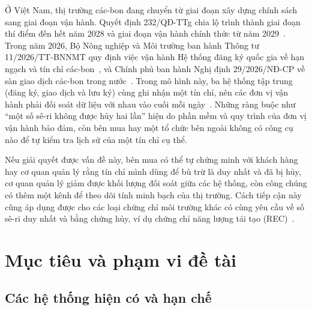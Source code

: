 Ở Việt Nam, thị trường các-bon đang chuyển từ giai đoạn xây dựng chính sách sang giai đoạn vận hành. Quyết định 232/QĐ-TTg chia lộ trình thành giai đoạn thí điểm đến hết năm 2028 và giai đoạn vận hành chính thức từ năm 2029~\cite{vietnam2025qd232}. Trong năm 2026, Bộ Nông nghiệp và Môi trường ban hành Thông tư 11/2026/TT-BNNMT quy định việc vận hành Hệ thống đăng ký quốc gia về hạn ngạch và tín chỉ các-bon~\cite{vietnam2026thongtu11}, và Chính phủ ban hành Nghị định 29/2026/NĐ-CP về sàn giao dịch các-bon trong nước~\cite{vietnam2026nghidinh29}. Trong mô hình này, ba hệ thống tập trung (đăng ký, giao dịch và lưu ký) cùng ghi nhận một tín chỉ, nên các đơn vị vận hành phải đối soát dữ liệu với nhau vào cuối mỗi ngày~\cite{vietnam2026thongtu11}. Những ràng buộc như ``một số sê-ri không được hủy hai lần'' hiện do phần mềm và quy trình của đơn vị vận hành bảo đảm, còn bên mua hay một tổ chức bên ngoài không có công cụ nào để tự kiểm tra lịch sử của một tín chỉ cụ thể.

Nếu giải quyết được vấn đề này, bên mua có thể tự chứng minh với khách hàng hay cơ quan quản lý rằng tín chỉ mình dùng để bù trừ là duy nhất và đã bị hủy, cơ quan quản lý giảm được khối lượng đối soát giữa các hệ thống, còn công chúng có thêm một kênh để theo dõi tính minh bạch của thị trường. Cách tiếp cận này cũng áp dụng được cho các loại chứng chỉ môi trường khác có cùng yêu cầu về số sê-ri duy nhất và bằng chứng hủy, ví dụ chứng chỉ năng lượng tái tạo (REC)~\cite{liu2024blockchain}.

\section{Mục tiêu và phạm vi đề tài}
\label{sec:muctieu}
\label{sec:nhiemvu}

\subsection*{Các hệ thống hiện có và hạn chế}
\label{subsec:hethonghienco}

